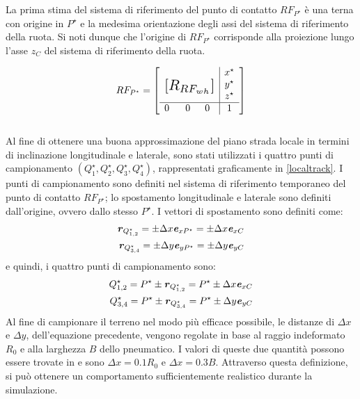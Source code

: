 La prima stima del sistema di riferimento del punto di contatto $RF_{P^\star}$ è una terna con origine in $P^\star$ e la medesima orientazione degli assi del sistema di riferimento della ruota. Si noti dunque che l'origine di $RF_{P^\star}$ corrisponde alla proiezione lungo l'asse $z_C$ del sistema di riferimento della ruota.

\begin{equation}
RF_{P^\star} = \left[
\begin{array}{ccc|c}
& & & x^\star\\
\multicolumn{3}{c|}{\multirow{3}{*}{\raisebox{20mm}{\scalebox{1.5}{$[R_{RF_{wh}}]$}}}} & y^\star\\
& & & z^\star\\ \hline
0 & ~~0 & 0 & 1
\end{array}\right]
\end{equation}\\

Al fine di ottenere una buona approssimazione del piano strada locale in termini di inclinazione longitudinale e laterale, sono stati utilizzati i quattro punti di campionamento $(Q^\star_1, Q^\star_2, Q^\star_3, Q^\star_4)$, rappresentati graficamente in \figurename{ \ref{localtrack}}. I punti di campionamento sono definiti nel sistema di riferimento temporaneo del punto di contatto $RF_{P^\star}$; lo spostamento longitudinale e laterale sono definiti dall'origine, ovvero dallo stesso $P^\star$. I vettori di spostamento sono definiti come:
%
\begin{equation}
\begin{split}
\textbf{\textit{r}}_{Q^\star_{1,2}} = \pm \Delta x \textbf{\textit{e}}_{xP^\star} = \pm \Delta x \textbf{\textit{e}}_{xC} \\
\textbf{\textit{r}}_{Q^\star_{3,4}} = \pm \Delta y \textbf{\textit{e}}_{yP^\star} = \pm \Delta y \textbf{\textit{e}}_{yC}
\end{split}
\end{equation}
%
e quindi, i quattro punti di campionamento sono:
%
\begin{equation}
\begin{split}
Q^\star_{1,2} = P^\star \pm \textbf{\textit{r}}_{Q^\star_{1,2}} = P^\star \pm \Delta x \textbf{\textit{e}}_{xC} \\
Q^\star_{3,4} = P^\star \pm \textbf{\textit{r}}_{Q^\star_{3,4}} = P^\star \pm \Delta y \textbf{\textit{e}}_{yC}
\end{split}
\end{equation}
%
Al fine di campionare il terreno nel modo più efficace possibile, le distanze di $\Delta x$ e $\Delta y$, dell'equazione precedente, vengono regolate in base al raggio indeformato $R_0$ e alla larghezza $B$ dello pneumatico. I valori di queste due quantità possono essere trovate in \cite{Rill} e sono $\Delta x = 0.1 R_0$ e $\Delta x = 0.3 B$. Attraverso questa definizione, si può ottenere un comportamento sufficientemente realistico durante la simulazione.

